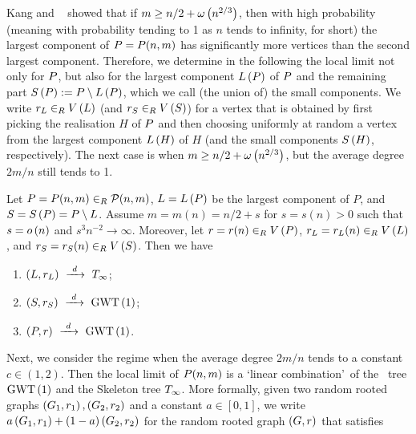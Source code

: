 Kang and \Luczak\ \cite{KangLuczak2012} showed that if $m\geq n/2+\omega\left(n^{2/3}\right)$, then with high probability (meaning with probability tending to 1 as $n$ tends to infinity, {\em \whp} for short) the largest component of $P=P(n,m)$ has significantly more vertices than the second largest component. Therefore, we determine in the following the local limit not only for $P$, but also for the largest component $L\left(P\right)$ of $P$ and the remaining part $S\left(P\right):=P\setminus L\left(P\right)$, which we call (the union of) the small components. We write $r_L\in_RV\left(L\right)$ (and $r_S\in_RV\left(S\right)$) for a vertex that is obtained by first picking the realisation $H$ of $P$ and then choosing uniformly at random a vertex from the largest component $L\left(H\right)$ of $H$ (and the small components $S\left(H\right)$, respectively). The next case is when $m\geq n/2+\omega\left(n^{2/3}\right)$, but the average degree $2m/n$ still tends to 1.
\begin{thm}\label{LSthm:main2}
Let $P=P(n,m)\in_R\mathcal{P}(n,m)$, $L=L\left(P\right)$ be the largest component of $P$, and $S=S\left(P\right)=P\setminus L$. Assume $m=m(n)=n/2+s$ for $s=s(n)>0$ such that $s=o\left(n\right)$ and $s^3n^{-2}\to\infty$. Moreover, let $r=r(n)\in_RV\left(P\right)$, $r_L=r_L(n)\in_RV\left(L\right)$, and $r_S=r_S(n)\in_RV\left(S\right)$. Then we have
\begin{enumerate}[label=\normalfont(\roman*)]
\item\label{LSthm:main2A} $\left(L, r_L\right)~\xrightarrow{~d~}~T_\infty$;
\item\label{LSthm:main2B}
$\left(S, r_S\right)~\xrightarrow{~d~}~\operatorname{GWT}\left(1\right)$;
\item\label{LSthm:main2C}
$\left(P, r\right)~\xrightarrow{~d~}~\operatorname{GWT}\left(1\right)$.
\end{enumerate}
\end{thm}
Next, we consider the regime when the average degree $2m/n$ tends to a constant $c\in (1,2)$. Then the local limit of $P(n,m)$ is a \lq linear combination\rq\ of the \GW\ tree $\operatorname{GWT}\left(1\right)$ and the Skeleton tree $T_\infty$. More formally, given two random rooted graphs $\left(G_1, r_1\right), \left(G_2, r_2\right)$ and a constant $a\in[0,1]$, we write $a\left(G_1, r_1\right)+(1-a)\left(G_2, r_2\right)$ for the random rooted graph $\left(G, r\right)$ that satisfies 

